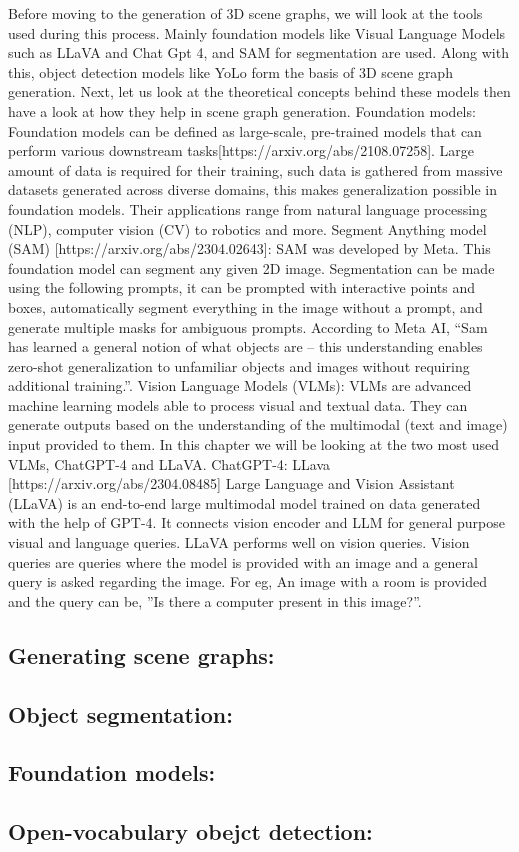 Before moving to the generation of 3D scene graphs, we will look at the tools used during this process. Mainly foundation models like Visual Language Models such as LLaVA and Chat Gpt 4, and SAM for segmentation are used. Along with this, object detection models like YoLo form the basis of 3D scene graph generation. Next, let us look at the theoretical concepts behind these models then have a look at how they help in scene graph generation.
Foundation models:
Foundation models can be defined as large-scale, pre-trained models that can perform various downstream tasks[https://arxiv.org/abs/2108.07258]. Large amount of data is required for their training, such data is gathered from massive datasets generated across diverse domains, this makes generalization possible in foundation models. Their applications range from natural language processing (NLP), computer vision (CV) to robotics and more.
Segment Anything model (SAM) [https://arxiv.org/abs/2304.02643]:
SAM was developed by Meta. This foundation model can segment any given 2D image. Segmentation can be made using the following prompts, it can be prompted with interactive points and boxes, automatically segment everything in the image without a prompt, and generate multiple masks for ambiguous prompts. According to Meta AI, “Sam has learned a general notion of what objects are – this understanding enables zero-shot generalization to unfamiliar objects and images without requiring additional training.”. 
Vision Language Models (VLMs):
VLMs are advanced machine learning models able to process visual and textual data. They  can generate outputs based on the understanding of the multimodal (text and image) input provided to them. In this chapter we will be looking at the two most used VLMs, ChatGPT-4 and LLaVA.
ChatGPT-4:
LLava [https://arxiv.org/abs/2304.08485]
 Large Language and Vision Assistant (LLaVA) is an end-to-end large multimodal model trained on data generated with the help of GPT-4. It connects vision encoder and LLM for general purpose visual and language queries. LLaVA performs well on vision queries. Vision queries are queries where the model is provided with an image and a general query is asked regarding the image. For eg, An image with a room is provided and the query can be, ”Is there a computer present in this image?”. 
\subsection{Generating scene graphs:}
\subsection{Object segmentation:}
\subsection{Foundation models:}
\subsection{Open-vocabulary obejct detection:}

